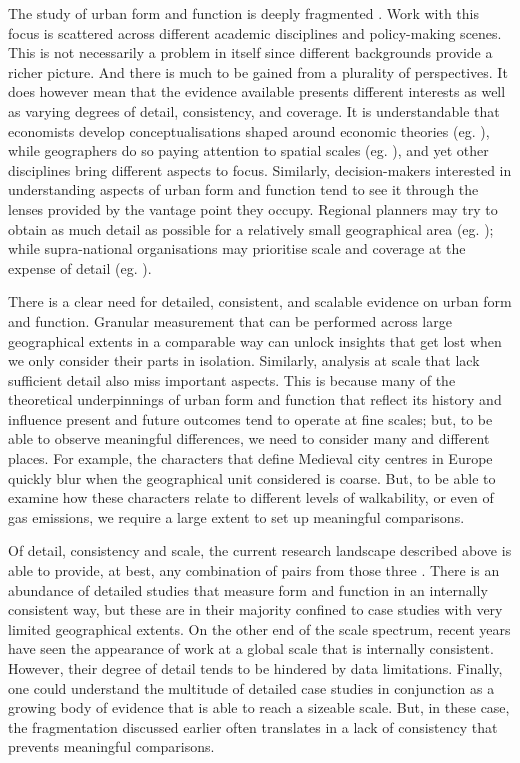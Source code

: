 The study of urban form and function is deeply fragmented
\citep{kropf2014ambiguity,brenner2015towards,gauthier2006mapping}.
Work with this focus is scattered across
different academic disciplines and policy-making scenes. This is not
necessarily a problem in itself since different backgrounds
provide a richer picture. And there is much to be gained from a plurality of
perspectives.
%
It does however mean that the evidence available presents different
interests as well as varying degrees of detail, consistency, and coverage.
It is understandable that economists develop conceptualisations shaped around
economic theories (eg. \citealp{ahlfeldt2019}), while geographers do so paying attention
to spatial scales (eg. \citealp{boeing2018}),
and yet other disciplines bring different aspects to focus.
Similarly, decision-makers interested in understanding aspects of urban form
and function tend to see it through the lenses provided by the vantage point
they occupy. Regional planners may try to obtain as much detail as
possible for a relatively small geographical area (eg. \citealp{bcnnight});
while supra-national organisations may prioritise scale and coverage
at the expense of detail (eg. \citealp{eea2016}).

There is a clear need for detailed, consistent, and scalable evidence on urban
form and function.
Granular measurement that can be performed across large
geographical extents in a comparable way can unlock insights that get lost
when we only consider their parts in isolation. Similarly, analysis at scale
that lack sufficient detail also miss important aspects.
%
This is because many of the
theoretical underpinnings of urban form and function that reflect its history
and influence present and future outcomes tend to operate at fine scales; but,
to be able to observe meaningful differences, we need to consider many and
different places.
%
For example, the characters that define Medieval city centres in Europe
quickly blur when the geographical unit considered is coarse. But, to be able to
examine how these characters relate to different levels of walkability, or
even of gas emissions, we require a large extent to set up meaningful
comparisons.

Of detail, consistency and scale, the current research landscape described above
is able to provide, at best, any combination of pairs from those three \citep{jochem2020,araldi2019,fleischmann2021methodological}.
%
There is an abundance of detailed studies that measure form and
function in an internally consistent way, but these are in their majority confined to
case studies with very limited geographical extents.
%
On the other end of the scale spectrum, recent years have seen the appearance
of work at a global scale that is internally consistent. However, their degree of detail
tends to be hindered by data limitations.
%
Finally, one could understand the multitude of detailed case studies in
conjunction as a growing body of evidence that is able to reach a sizeable
scale. But, in these case, the fragmentation discussed earlier often
translates in a lack of consistency that prevents meaningful comparisons.

